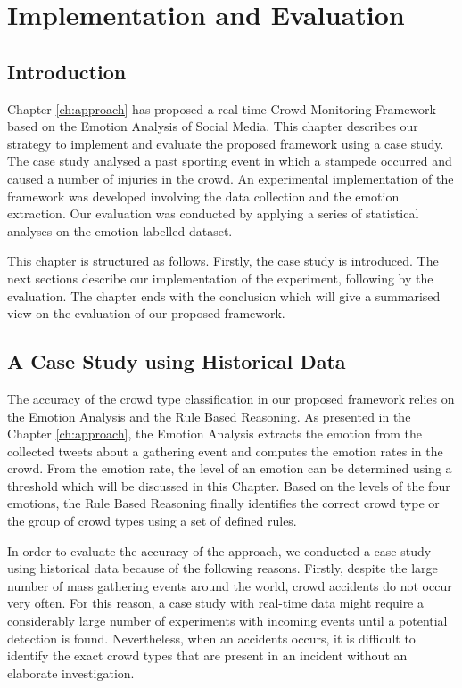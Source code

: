 \chapter{Implementation and Evaluation}
\label{ch:eval}
\ifpdf
    \graphicspath{{Chapter5/Figs/Raster/}{Chapter5/Figs/PDF/}{Chapter5/Figs/}}
\else
    \graphicspath{{Chapter5/Figs/Vector/}{Chapter5/Figs/}}
\fi

\section{Introduction}
Chapter \ref{ch:approach} has proposed a real-time Crowd Monitoring Framework based on the Emotion Analysis of Social Media. This chapter describes our strategy to implement and evaluate the proposed framework using a case study. The case study analysed a past sporting event in which a stampede occurred and caused a number of injuries in the crowd. An experimental implementation of the framework was developed involving the data collection and the emotion extraction. Our evaluation was conducted by applying a series of statistical analyses on the emotion labelled dataset.

This chapter is structured as follows. Firstly, the case study is introduced. The next sections describe our implementation of the experiment, following by the evaluation. The chapter ends with the conclusion which will give a summarised view on the evaluation of our proposed framework.

\section{A Case Study using Historical Data}

The accuracy of the crowd type classification in our proposed framework relies on the Emotion Analysis and the Rule Based Reasoning. As presented in the Chapter \ref{ch:approach}, the Emotion Analysis extracts the emotion from the collected tweets about a gathering event and computes the emotion rates in the crowd. From the emotion rate, the level of an emotion can be determined using a threshold which will be discussed in this Chapter. Based on the levels of the four emotions, the Rule Based Reasoning finally identifies the correct crowd type or the group of crowd types using a set of defined rules.

In order to evaluate the accuracy of the approach, we conducted a case study using historical data because of the following reasons. Firstly, despite the large number of mass gathering events around the world, crowd accidents do not occur very often. For this reason, a case study with real-time data might require a considerably large number of experiments with incoming events until a potential detection is found. Nevertheless, when an accidents occurs, it is difficult to identify the exact crowd types that are present in an incident without an elaborate investigation.

